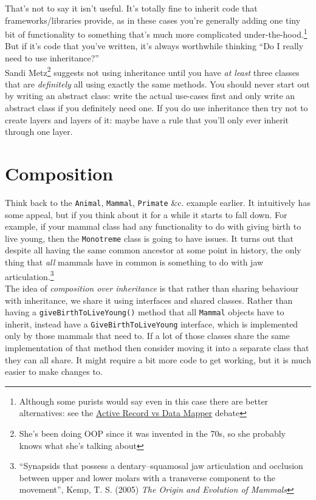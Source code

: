 That's not to say it isn't useful. It's totally fine to inherit code that frameworks/libraries provide, as in these cases you're generally adding one tiny bit of functionality to something that's much more complicated under-the-hood.\footnote{Although some purists would say even in this case there are better alternatives: see the \href{https://www.thoughtfulcode.com/orm-active-record-vs-data-mapper/}{Active Record vs Data Mapper} debate} But if it's code that you've written, it's always worthwhile thinking ``Do I really need to use inheritance?''
\\

Sandi Metz\footnote{She's been doing OOP since it was invented in the 70s, so she probably knows what she's talking about} suggests not using inheritance until you have \textit{at least} three classes that are \textit{definitely} all using exactly the same methods. You should never start out by writing an abstract class: write the actual use-cases first and only write an abstract class if you definitely need one. If you do use inheritance then try not to create layers and layers of it: maybe have a rule that you'll only ever inherit through one layer.




\section{Composition}


Think back to the \texttt{Animal}, \texttt{Mammal}, \texttt{Primate} \&c. example earlier. It intuitively has some appeal, but if you think about it for a while it starts to fall down. For example, if your mammal class had any functionality to do with giving birth to live young, then the \texttt{Monotreme} class is going to have issues. It turns out that despite all having the same common ancestor at some point in history, the only thing that \textit{all} mammals have in common is something to do with jaw articulation.\footnote{``Synapsids that possess a dentary–squamosal jaw articulation and occlusion between upper and lower molars with a transverse component to the movement'', Kemp, T. S. (2005) \textit{The Origin and Evolution of Mammals}}
\\

The idea of \textit{composition over inheritance} is that rather than sharing behaviour with inheritance, we share it using interfaces and shared classes. Rather than having a \texttt{giveBirthToLiveYoung()} method that all \texttt{Mammal} objects have to inherit, instead have a \texttt{GiveBirthToLiveYoung} interface, which is implemented only by those mammals that need to. If a lot of those classes share the same implementation of that method then consider moving it into a separate class that they can all share. It might require a bit more code to get working, but it is much easier to make changes to.


